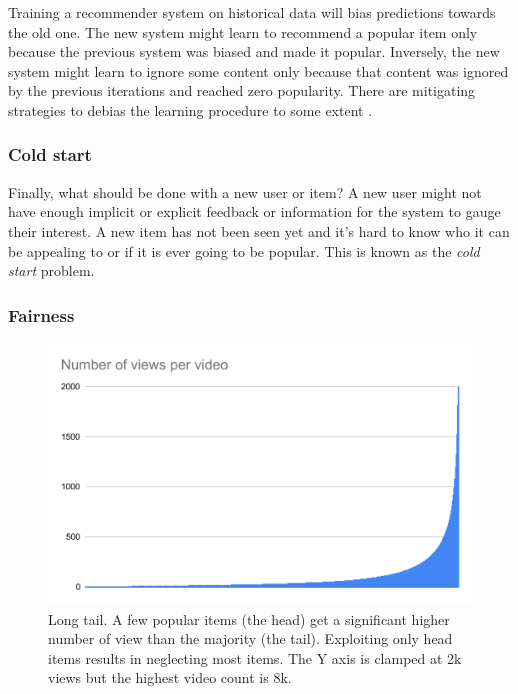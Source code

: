 Training a recommender system on historical data will bias predictions towards the old one. The new system might learn to recommend a popular item only because the previous system was biased and made it popular. Inversely, the new system might learn to ignore some content only because that content was ignored by the previous iterations and reached zero popularity. There are mitigating strategies to debias the learning procedure to some extent \citep{youtuberec}.

\subsubsection{Cold start}

Finally, what should be done with a new user or item? A new user might not have enough implicit or explicit feedback or information for the system to gauge their interest. A new item has not been seen yet and it's hard to know who it can be appealing to or if it is ever going to be popular. This is known as the \emph{cold start} problem.

\subsubsection{Fairness}

\begin{figure}
    \centering
    \includegraphics[width=\columnwidth]{70-files/long-tail.pdf}
    \caption{Long tail. A few popular items (the head) get a significant higher number of view than the majority (the tail). Exploiting only head items results in neglecting most items. The Y axis is clamped at 2k views but the highest video count is 8k.}
    \label{fig:long-tail}
\end{figure}

